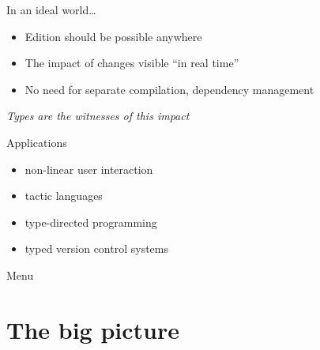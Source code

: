 \documentclass[ignorenonframetext,red]{beamer}
\begin{document}
\begin{frame}{In an ideal world\ldots}
  \begin{itemize}
  \item Edition should be possible anywhere
  \item The impact of changes visible “in real time”
  \item No need for separate compilation, dependency management
  \end{itemize}
  \pause
  \vspace{2em}
  \begin{center}
    {\Large \it Types are the witnesses of this impact}
  \end{center}
  \vspace{1em}
  \pause
  \begin{block}{Applications}
    \begin{itemize}
    \item non-linear user interaction
    \item tactic languages
    \item type-directed programming
    \item typed version control systems
    \end{itemize}
  \end{block}
\end{frame}

\begin{frame}{Menu}
  \tableofcontents
\end{frame}

\section{The big picture}
\end{document}
